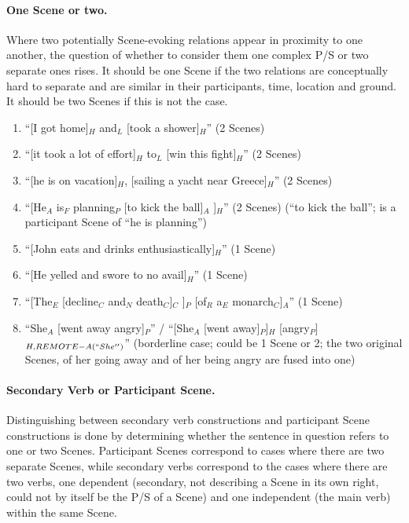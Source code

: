 \documentclass[11pt]{article}
\newcommand{\be}{\begin{enumerate}}
\newcommand{\ee}{\end{enumerate}}
\begin{document}
\paragraph{One Scene or two.} Where two potentially Scene-evoking relations appear in proximity to one another, the question of whether to consider them one complex P/S or two separate ones rises. It should be one Scene if the two relations are conceptually hard to separate and are similar in their participants, time, location and ground. It should be two Scenes if this is not the case.
\be
\item
  ``[I got home]$_H$ and$_L$ [took a shower]$_H$'' (2 Scenes)
\item
  ``[it took a lot of effort]$_H$ to$_L$ [win this fight]$_H$'' (2 Scenes)
\item
  ``[he is on vacation]$_H$, [sailing a yacht near Greece]$_H$'' (2 Scenes)
\item
  ``[He$_A$ is$_F$ planning$_P$ [to kick the ball]$_A$ ]$_H$'' (2 Scenes) (``to kick the ball''; is a participant Scene of ``he is planning'')
  \item
    ``[John eats and drinks enthusiastically]$_H$'' (1 Scene)
\item
  ``[He yelled and swore to no avail]$_H$'' (1 Scene)
\item
  ``[The$_E$ [decline$_C$ and$_N$ death$_C$]$_C$ ]$_P$ [of$_R$ a$_E$ monarch$_C$]$_A$'' (1 Scene)
\item
  ``She$_A$ [went away angry]$_P$'' / ``[She$_A$ [went away]$_P$]$_H$ [angry$_P$]$_{H,REMOTE-A(``She'')}$'' (borderline case; could be 1 Scene or 2; the two original Scenes, of her going away and of her being angry are fused into one)
\ee

\paragraph{Secondary Verb or Participant Scene.} Distinguishing between secondary verb constructions and participant Scene constructions is done by determining whether the sentence in question refers to one or two Scenes. Participant Scenes correspond to cases where there are two separate Scenes, while secondary verbs correspond to the cases where there are two verbs, one dependent (secondary, not describing a Scene in its own right, could not by itself be the P/S of a Scene) and one independent (the main verb) within the same Scene.
\end{document}
